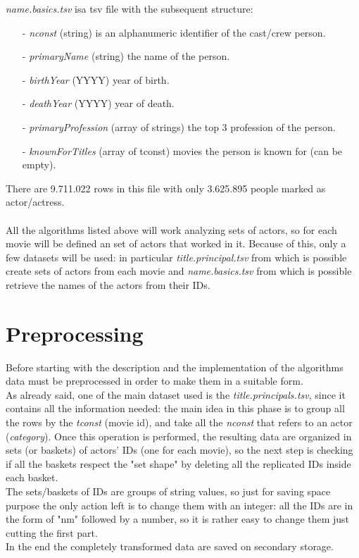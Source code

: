 \documentclass[14pt]{extarticle}
\begin{document}
\noindent
{\it name.basics.tsv} isa  tsv file with the subsequent structure:
\begin{itemize}[leftmargin=*]
\vspace{-0.4cm}\item[-]{\it nconst } (string) is an alphanumeric identifier of the cast/crew person.
\vspace{-1.1cm}\item[-]{\it primaryName } (string) the name of the person.
\vspace{-0.4cm}\item[-]{\it birthYear } (YYYY) year of birth.
\vspace{-0.4cm}\item[-]{\it deathYear  } (YYYY) year of death.
\vspace{-0.4cm}\item[-]{\it primaryProfession } (array of strings) the top 3 profession of the person.
\vspace{-1.0cm}\item[-]{\it knownForTitles  } (array of tconst) movies the person is known for (can be empty).
\end{itemize}
There are 9.711.022 rows in this file with only 3.625.895 people marked as actor/actress.
\\
\\
All the algorithms listed above will work analyzing sets of actors, so for each movie
will be defined an set of actors that worked in it.
Because of this, only a few datasets will be used: in particular {\it title.principal.tsv} from which is possible create sets of actors from each movie and {\it name.basics.tsv} from which is possible retrieve the names of the actors from their IDs.

\section{Preprocessing}
Before starting with the description and the implementation of the algorithms
data must be preprocessed in order to make them in a suitable form.\\
As already said, one of the main dataset used is the {\it title.principals.tsv}, since it contains all the information needed: the main idea in this phase is to group all the rows by the {\it tconst} (movie id), and take all the {\it nconst} that refers to an actor ({\it category}). Once this operation is performed, the resulting data are organized in sets (or baskets) of actors' IDs (one for each movie), so the next step is checking if all the baskets respect the "set shape" by deleting all the replicated IDs inside each basket.\\ 
The sets/baskets of IDs are groups of string values, so just for saving space purpose
the only action left is to change them with an integer: all the IDs are in the form of "nm" followed by a number, so it is rather easy to change them just cutting the first part.\\
In the end the completely transformed data are saved on secondary storage.\\
\end{document}
